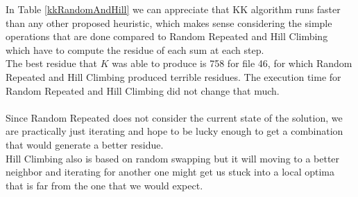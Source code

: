 \documentclass[tikz, 12pt]{scrartcl}
\begin{document}
In Table \ref{kkRandomAndHill} we can appreciate that KK algorithm runs faster than any other proposed heuristic, which makes sense considering the simple operations that are done compared to Random Repeated and Hill Climbing which have to compute the residue of each sum at each step.\\
The best residue that $K$ was able to produce is 758 for file 46, for which Random Repeated and Hill Climbing produced terrible residues. The execution time for Random Repeated and Hill Climbing did not change that much.\\
\\
Since Random Repeated does not consider the current state of the solution, we are practically just iterating and hope to be lucky enough to get a combination that would generate a better residue. \\
Hill Climbing also is based on random swapping but it will moving to a better neighbor and iterating for another one might get us stuck into a local optima that is far from the one that we would expect.
\end{document}
